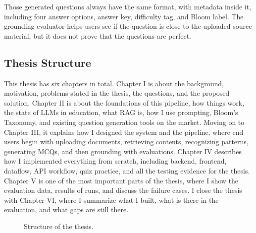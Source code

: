 \documentclass[12pt,a4paper]{article}
\begin{document}
Those generated questions always have the same format, with metadata inside
it, including four answer options, answer key, difficulty tag, and Bloom
label. The grounding evaluator helps users see if the question is close to
the uploaded source material, but it does not prove that the questions are
perfect.

\subsection{Thesis Structure}

This thesis has six chapters in total. Chapter I is about the background,
motivation, problems stated in the thesis, the questions, and the proposed
solution. Chapter II is about the foundations of this pipeline, how things
work, the state of LLMs in education, what RAG is, how I use prompting,
Bloom's Taxonomy, and existing question generation tools on the market.
Moving on to Chapter III, it explains how I designed the system and the
pipeline, where end users begin with uploading documents, retrieving
contents, recognizing patterns, generating MCQs, and then grounding with
evaluations. Chapter IV describes how I implemented everything from scratch,
including backend, frontend, dataflow, API workflow, quiz practice, and all
the testing evidence for the thesis. Chapter V is one of the most important
parts of the thesis, where I show the evaluation data, results of runs, and
discuss the failure cases. I close the thesis with Chapter VI, where I
summarize what I built, what is there in the evaluation, and what gaps are
still there.

\begin{figure}[H]
  \centering
  \singlespacing
  \caption{Structure of the thesis.}
  \label{fig:thesis-structure}
\end{figure}
\end{document}
